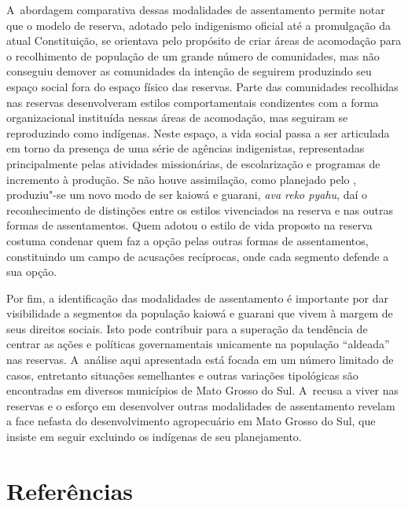 A~abordagem comparativa dessas modalidades de assentamento permite notar
que o modelo de reserva, adotado pelo indigenismo oficial até a
promulgação da atual Constituição, se orientava pelo propósito de criar
áreas de acomodação para o recolhimento de população de um grande
número de comunidades, mas não conseguiu demover as comunidades da
intenção de seguirem produzindo seu espaço social fora do espaço físico
das reservas. Parte das comunidades recolhidas nas reservas
desenvolveram estilos comportamentais condizentes com a forma
organizacional instituída nessas áreas de acomodação, mas seguiram se
reproduzindo como indígenas. Neste espaço, a vida social passa a ser
articulada em torno da presença de uma série de agências indigenistas,
representadas principalmente pelas atividades missionárias, de
escolarização e programas de incremento à produção. Se não houve
assimilação, como planejado pelo , produziu"-se um novo modo de ser
kaiowá e guarani, \emph{ava reko pyahu}, daí o reconhecimento de distinções
entre os estilos vivenciados na reserva e nas outras formas de
assentamentos. Quem adotou o estilo de vida proposto na reserva costuma
condenar quem faz a opção pelas outras formas de assentamentos,
constituindo um campo de acusações recíprocas, onde cada segmento
defende a sua opção.

Por fim, a identificação das modalidades de assentamento é importante
por dar visibilidade a segmentos da população kaiowá e guarani que
vivem à margem de seus direitos sociais. Isto pode contribuir para a
superação da tendência de centrar as ações e políticas governamentais
unicamente na população ``aldeada'' nas reservas. A~análise aqui
apresentada está focada em um número limitado de casos, entretanto
situações semelhantes e outras variações tipológicas são encontradas em
diversos municípios de Mato Grosso do Sul. A~recusa a viver nas
reservas e o esforço em desenvolver outras modalidades de assentamento
revelam a face nefasta do desenvolvimento agropecuário em Mato Grosso
do Sul, que insiste em seguir excluindo os indígenas de seu
planejamento.

\section{Referências}

